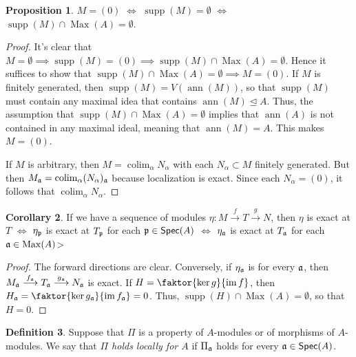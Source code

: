 \documentclass[10pt,letterpaper,cm]{nupset}
\theoremstyle{definition}
\newtheorem{definition}{Definition}[subsection]
\theoremstyle{theorem}
\newtheorem{prop}[definition]{Proposition}
\newtheorem{corollary}[definition]{Corollary}
\theoremstyle{remark}
\newcommand{\1}{\mathbf{1}}
\newcommand{\0}{\vec 0}
\DeclareMathOperator{\ann}{ann}
\DeclareMathOperator{\im}{im}
\DeclareMathOperator{\colim}{colim}
\DeclareMathOperator{\Max}{Max}
\DeclareMathOperator{\supp}{supp}
\begin{document}
\begin{prop}
$M= (0)$ $\iff$ $\supp(M) = \emptyset$ $\iff$ $\supp(M) \cap \Max(A) = \emptyset$.
\end{prop}
\begin{proof}
It's clear that $M = \emptyset \implies \supp(M) = (0) \implies \supp(M) \cap \Max(A) = \emptyset$. Hence it suffices to show that  $\supp(M) \cap \Max(A) = \emptyset \implies M= (0)$. If $M$ is finitely generated, then $\supp(M) = V(\ann(M))$, so that $\supp(M)$ must contain any maximal idea that contains $\ann(M) \unlhd A$. Thus, the assumption that $\supp(M) \cap \Max(A) = \emptyset$ implies that $\ann(A)$ is not contained in any maximal ideal, meaning that $\ann(M) = A$. This makes $M= (0)$. 

\medskip


If $M$ is arbitrary, then $M = \colim_{\alpha} N_{\alpha}$ with each $N_{\alpha} \subset M$ finitely generated. But then $M_{\frak{a}} = \colim_{\alpha} (N_{\alpha})_{\frak{a}}$ because localization is exact.  Since each $N_{\alpha} = (0)$, it follows that $\colim_{\alpha} N_{\alpha}$. 
\end{proof}


\begin{corollary}
If we have a sequence of modules $\eta: M \overset{f}{\longrightarrow} T \overset{g}{\longrightarrow} N$, then $\eta$ is exact at $T$ $\iff$ $\eta_{\frak{p}}$ is exact at $T_{\frak{p}}$ for each $\frak{p} \in \mathsf{Spec}(A)$ $\iff$ $\eta_{\frak{a}}$ is exact at $T_{\frak{a}}$ for each $\frak{a} \in \Max(A)$>  
\end{corollary}
\begin{proof}
The forward directions are clear. Conversely, if $\eta_{\frak{a}}$ is for every $\frak{a}$, then $M_{\frak{a}} \overset{f_{\frak{a}}}{\longrightarrow} T_{\frak{a}} \overset{g_{\frak{a}}}{\longrightarrow} N_{\frak{a}}$ is exact. If $H = \faktor{\ker{g}}{\im{f}}$, then $H_{\frak{a}} = \faktor{\ker{g_{\frak{a}}}}{\im{f_{\frak{a}}}} = 0$. Thus, $\supp(H) \cap \Max(A) = \emptyset$, so that $H= 0$. 
\end{proof}

\begin{definition}
Suppose that $\Pi$ is a property of $A$-modules or of morphisms of $A$-modules. We say that \textit{$\Pi$ holds locally for $A$} if $\Pi_{\frak{a}}$ holds for every $\frak{a} \in \mathsf{Spec}(A)$.  
\end{definition}
\end{document}
